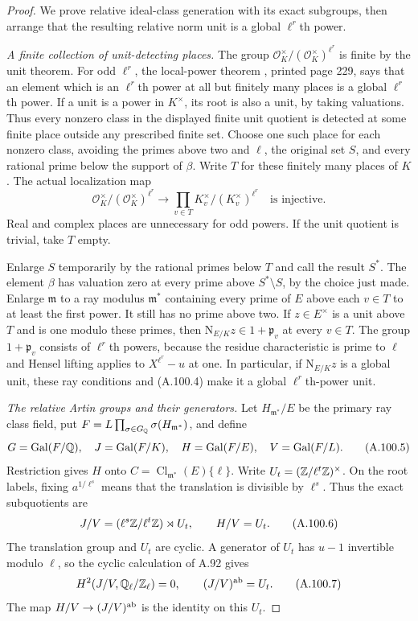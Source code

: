 \begin{proof}
We prove relative ideal-class generation with its exact
subgroups, then arrange that the resulting relative norm
unit is a global $\ell^r$th power.

\emph{A finite collection of unit-detecting places.}
The group
$\mathcal O_K^\times/(\mathcal O_K^\times)^{\ell^r}$
is finite by the unit theorem.
For odd $\ell^r$, the local-power theorem
\cite[VIII, Theorem 1.4]{MilneCFT}, printed page 229,
says that an element which is an $\ell^r$th power at
all but finitely many places is a global $\ell^r$th power.
If a unit is a power in $K^\times$, its root is also
a unit, by taking valuations.
Thus every nonzero class in the displayed finite unit
quotient is detected at some finite place outside any
prescribed finite set.
Choose one such place for each nonzero class, avoiding
the primes above two and $\ell$, the original set $S$,
and every rational prime below the support of $\beta$.
Write $T$ for these finitely many places of $K$.
The actual localization map
\[
 \mathcal O_K^\times/(\mathcal O_K^\times)^{\ell^r}
       \longrightarrow
       \prod_{v\in T}K_v^\times/(K_v^\times)^{\ell^r}
                   \quad\text{is injective}.
 \tag{A.100.4}
\]
Real and complex places are unnecessary for odd powers.
If the unit quotient is trivial, take $T$ empty.

Enlarge $S$ temporarily by the rational primes below
$T$ and call the result $S^*$.
The element $\beta$ has valuation zero at every prime
above $S^*\setminus S$, by the choice just made.
Enlarge $\mathfrak m$ to a ray modulus $\mathfrak m^*$
containing every prime of $E$ above each $v\in T$ to
at least the first power.
It still has no prime above two.
If $z\in E^\times$ is a unit above $T$ and is one
modulo these primes, then
$\mathrm N_{E/K}z\in1+\mathfrak p_v$ at every $v\in T$.
The group $1+\mathfrak p_v$ consists of $\ell^r$th powers,
because the residue characteristic is prime to $\ell$
and Hensel lifting applies to $X^{\ell^r}-u$ at one.
In particular, if $\mathrm N_{E/K}z$ is a global unit,
these ray conditions and (A.100.4) make it a global
$\ell^r$th-power unit.

\emph{The relative Artin groups and their generators.}
Let $H_{\mathfrak m^*}/E$ be the primary ray class field,
put $F=L\prod_{\sigma\in G_\mathbb Q}\sigma(H_{\mathfrak m^*})$,
and define
\[
 G=\operatorname{Gal}(F/\mathbb Q),\quad
 J=\operatorname{Gal}(F/K),\quad
 H=\operatorname{Gal}(F/E),\quad
 V=\operatorname{Gal}(F/L).
 \tag{A.100.5}
\]
Restriction gives $H$ onto
$C=\operatorname{Cl}_{\mathfrak m^*}(E)\{\ell\}$.
Write $U_t=(\mathbb Z/\ell^t\mathbb Z)^\times$.
On the root labels, fixing $a^{1/\ell^s}$ means that
the translation is divisible by $\ell^s$.
Thus the exact subquotients are
\[
 J/V=(\ell^s\mathbb Z/\ell^t\mathbb Z)\rtimes U_t,
                    \qquad H/V=U_t.
 \tag{A.100.6}
\]
The translation group and $U_t$ are cyclic.
A generator of $U_t$ has $u-1$ invertible modulo $\ell$,
so the cyclic calculation of A.92 gives
\[
 H^2(J/V,\mathbb Q_\ell/\mathbb Z_\ell)=0,
            \qquad (J/V)^{\rm ab}=U_t.
 \tag{A.100.7}
\]
The map $H/V\to(J/V)^{\rm ab}$ is the identity on
this $U_t$.


\end{proof}
